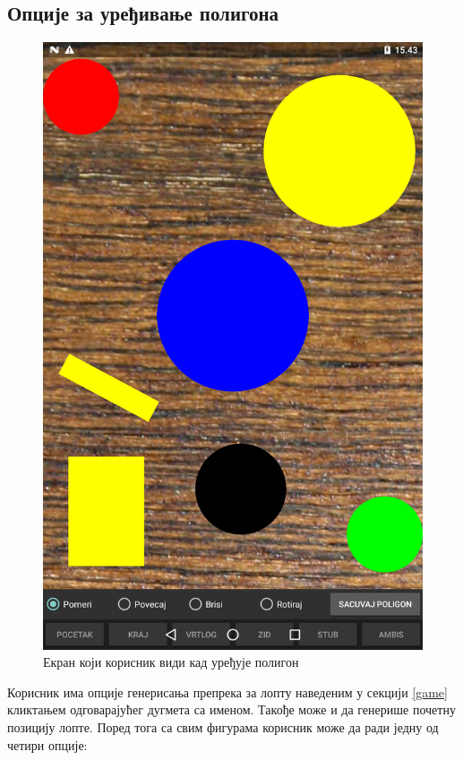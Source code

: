\subsection{Опције за уређивање полигона}
\begin{figure}[htb!]
\begin{center}
\includegraphics[scale=.1]{pictures/createPolygon/Basic}
\caption{Екран који корисник види кад уређује полигон}\label{fig:createPolygonBasic}
\end{center}
\end{figure}
Корисник има опције генерисања препрека за лопту наведеним у секцији \ref{game} кликтањем одговарајућег дугмета са именом. Такође може и да генерише почетну позицију лопте.  Поред тога са свим фигурама корисник може да ради једну од четири опције:
